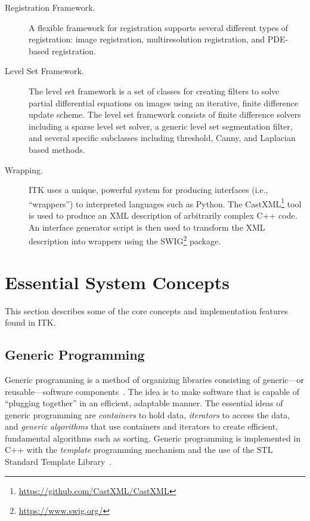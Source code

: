 \begin{description}
  \item[Registration Framework.] A flexible framework for registration
        supports several different types of registration: image registration,
        multiresolution registration, and PDE-based registration.

  \item[Level Set Framework.] The level set framework is a set of
        classes for creating filters to solve partial differential equations
        on images using an iterative, finite difference update scheme. The
        level set framework consists of finite difference solvers including a
        sparse level set solver, a generic level set segmentation filter, and
        several specific subclasses including threshold, Canny, and Laplacian
        based methods.

  \item[Wrapping.] ITK uses a unique, powerful system for producing interfaces
        (i.e., ``wrappers'') to interpreted languages such as Python. The
        CastXML\footnote{\url{https://github.com/CastXML/CastXML}}
        tool is used to produce an XML description of arbitrarily complex C++
        code. An interface generator script is then used to transform the XML
        description into wrappers using the
        SWIG\footnote{\url{https://www.swig.org/}} package.

\end{description}


\section{Essential System Concepts}%
\label{sec:EssentialSystemConcepts}

This section describes some of the core concepts and implementation features
found in ITK.

\subsection{Generic Programming}%
\label{sec:GenericProgramming}%
%

Generic programming is a method of organizing libraries consisting of
generic---or reusable---software components~\cite{Musser1996}. The idea is to
make software that is capable of ``plugging together'' in an efficient,
adaptable manner. The essential ideas of generic programming are
\emph{containers} to hold data, \emph{iterators} to access the data, and
\emph{generic algorithms} that use containers and iterators to create
efficient, fundamental algorithms such as sorting. Generic programming is
implemented in C++ with the \emph{template} programming mechanism and the
use of the STL Standard Template Library~\cite{Austern1999}.

